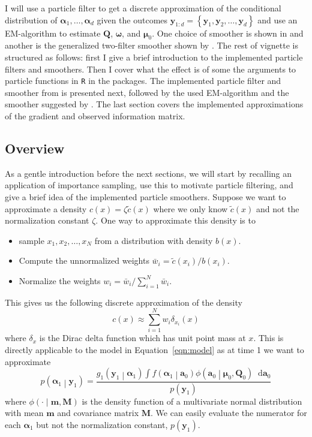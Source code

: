 \documentclass[notitlepage]{article}
\renewcommand{\vec}[1]{\bm{#1}}
\newcommand{\mat}[1]{\mathbf{#1}}
\newcommand{\Lbrace}[1]{\left\{ #1\right\}}
\newcommand{\Lparen}[1]{\left( #1\right)}
\newcommand{\Cond}[2]{ #1 \middle\vert  #2}
\newcommand*\diff{\mathop{}\!\mathrm{d}}
\newcommand{\optor}[2]{#1\Lparen{#2}}
\newcommand{\optorC}[3]{\optor{#1}{\Cond{#2}{#3}}}
\newcommand{\pdens}[1]{\optor{p}{#1}}
\newcommand{\pdensC}[2]{\optorC{p}{#1}{#2}}
\newcommand{\normaldC}[3]{\optorC{\phi}{#1}{#2,#3}}
\newcommand\dirac[2]{\optor{\delta_{#1}}{#2}}
\newcommand{\nPart}{N}
\newcommand{\nPeriods}{d}
\begin{document}
I will use a particle filter to get a discrete approximation of
the conditional distribution of 
$\vec{\alpha}_1, \dots, \vec{\alpha}_\nPeriods$ given the outcomes 
$\vec{y}_{1:\nPeriods} = \Lbrace{\vec{y}_1,\vec{y}_2,\dots, \vec{y}_\nPeriods}$ and use 
an EM-algorithm to estimate $\mat{Q}$, $\vec\omega$, and $\vec\mu_0$. One choice of smoother is 
shown in \cite{fearnhead10} and another is the generalized two-filter smoother shown by \cite{briers09}. 
The rest of
vignette is structured as follows: first I give a brief introduction to the implemented particle
filters and smoothers. Then I cover what the effect is of some the arguments to 
particle functions in \texttt{R} in the packages. 
The implemented particle filter and smoother from \cite{fearnhead10} is presented next, followed by 
the used EM-algorithm and the smoother suggested by \cite{briers09}.
The last section covers the implemented approximations of the gradient and
observed information matrix. 
  
\subsection{Overview}
As a gentle introduction before the next sections, we will start by 
recalling an application of importance sampling, use this to motivate particle filtering, 
and give a brief idea of the implemented particle smoothers. 
Suppose we want to approximate a
density $c(x) = \zeta\tilde c(x)$ where we only know $\tilde c(x)$ and not 
the normalization constant $\zeta$. One way to approximate this density is 
to %
%
\begin{itemize}
  \item sample $x_1,x_2,\dots,x_\nPart$ from a distribution with density $b(x)$.
  \item Compute the unnormalized weights $\bar w_i = \tilde c(x_i) / b(x_i)$.
  \item Normalize the weights $w_i = \bar w_i / \sum_{i = 1}^\nPart\bar w_i$. 
\end{itemize}%
%
This gives us the following discrete approximation of the density %
%
$$c(x) \approx \sum_{i = 1}^\nPart w_i\dirac{x_i}{x}$$%
% 
where $\delta_{x}$ is the Dirac delta function which has unit point mass
at $x$. This is directly applicable to the model
in Equation~\eqref{eqn:model} as at time 1 we want to approximate %
%
$$
\pdensC{\vec\alpha_1}{\vec y_1} = \frac{
	\optorC{g_1}{\vec y_1}{\vec\alpha_1} 
	\int\optorC{f}{\vec\alpha_1}{\vec a_0}
	\normaldC{\vec a_0}{\vec\mu_0}{\mat Q_0}\diff\vec a_0
	}{\pdens{\vec y_1}}
$$%
%
where $\normaldC{\cdot}{\vec m}{\mat M}$ is the density function of a multivariate normal 
distribution with mean $\vec m$ and covariance matrix $\mat M$. We can easily evaluate the 
numerator for each $\vec\alpha_1$ but not the normalization constant, $\pdens{\vec y_1}$. 
\end{document}
